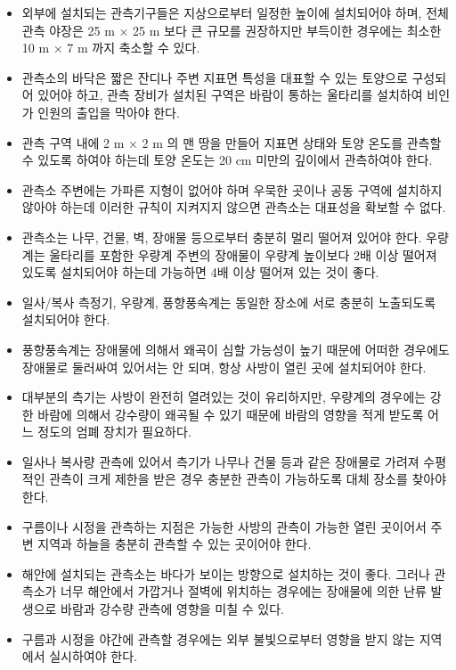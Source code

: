 \begin{itemize}
	\item 외부에 설치되는 관측기구들은 지상으로부터 일정한 높이에 설치되어야 하며, 전체 관측 야장은 25 m × 25 m 보다 큰 규모를 권장하지만 부득이한 경우에는 최소한 10 m × 7 m 까지 축소할 수 있다. 
	\item 관측소의 바닥은 짧은 잔디나 주변 지표면 특성을 대표할 수 있는 토양으로 구성되어 있어야 하고, 관측 장비가 설치된 구역은 바람이 통하는 울타리를 설치하여 비인가 인원의 출입을 막아야 한다. 
	\item 관측 구역 내에 2 m × 2 m 의 맨 땅을 만들어 지표면 상태와 토양 온도를 관측할 수 있도록 하여야 하는데 토양 온도는 20 cm 미만의 깊이에서 관측하여야 한다.
	\item 관측소 주변에는 가파른 지형이 없어야 하며 우묵한 곳이나 공동 구역에 설치하지 않아야 하는데 이러한 규칙이 지켜지지 않으면 관측소는 대표성을 확보할 수 없다.
	\item 관측소는 나무, 건물, 벽, 장애물 등으로부터 충분히 멀리 떨어져 있어야 한다. 우량계는 울타리를 포함한 우량계 주변의 장애물이 우량계 높이보다 2배 이상 떨어져 있도록 설치되어야 하는데 가능하면 4배 이상 떨어져 있는 것이 좋다.
	\item 일사/복사 측정기, 우량계, 풍향풍속계는 동일한 장소에 서로 충분히 노출되도록 설치되어야 한다.
	\item 풍향풍속계는 장애물에 의해서 왜곡이 심할 가능성이 높기 때문에 어떠한 경우에도 장애물로 둘러싸여 있어서는 안 되며, 항상 사방이 열린 곳에 설치되어야 한다.
	\item 대부분의 측기는 사방이 완전히 열려있는 것이 유리하지만, 우량계의 경우에는 강한 바람에 의해서 강수량이 왜곡될 수 있기 때문에 바람의 영향을 적게 받도록 어느 정도의 엄폐 장치가 필요하다.
	\item 일사나 복사량 관측에 있어서 측기가 나무나 건물 등과 같은 장애물로 가려져 수평적인 관측이 크게 제한을 받은 경우 충분한 관측이 가능하도록 대체 장소를 찾아야 한다.
	\item 구름이나 시정을 관측하는 지점은 가능한 사방의 관측이 가능한 열린 곳이어서 주변 지역과 하늘을 충분히 관측할 수 있는 곳이어야 한다.
	\item 해안에 설치되는 관측소는 바다가 보이는 방향으로 설치하는 것이 좋다. 그러나 관측소가 너무 해안에서 가깝거나 절벽에 위치하는 경우에는 장애물에 의한 난류 발생으로 바람과 강수량 관측에 영향을 미칠 수 있다.
	\item 구름과 시정을 야간에 관측할 경우에는 외부 불빛으로부터 영향을 받지 않는 지역에서 실시하여야 한다.
\end{itemize}


